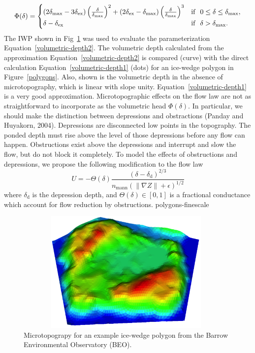 \documentclass[review,11pt]{elsarticle}
\begin{document}
\begin{equation}\label{volumetric-depth2}
\Phi (\delta) =
\begin{cases} (2 \delta_\text{max} - 3 \delta_\text{ex}) \left(\frac{\delta}{\delta_\text{max}} \right )^2 + (2 \delta_\text{ex} -  \delta_\text{max}) \left(\frac{\delta}{\delta_\text{max}} \right )^3 & \text{if} \hskip 0.1in 0 \leq \delta \leq \delta_\text{max}, \\
\delta - \delta_\text{ex} & \text{if} \hskip .1in \delta > \delta_\text{max}.
\end{cases}
\end{equation}
The IWP shown in Fig~\ref{3Dpolygon40} was used to evaluate the parameterization Equation~\ref{volumetric-depth2}. The volumetric depth calculated from the approximation Equation~\ref{volumetric-depth2} is compared (curve) with the direct calculation Equation~\ref{volumetric-depth1} (dots) for an ice-wedge polygon in Figure~\ref{polygons}. Also, shown is the volumetric depth in the absence of microtopography, which is linear with slope unity. Equation~\ref{volumetric-depth1} is a very good approximation.
Microtopographic effects on the flow law are not as straightforward to incorporate as the volumetric head $\Phi(\delta)$. In particular, we should make the distinction between depressions and obstractions (Panday and Huyakorn, 2004). Depressions are disconnected low points in the topography. The ponded depth must rise above the level of those depressions before any flow can happen. Obstructions exist above the depressions and interrupt and slow the flow, but do not block it completely.
To model the effects of obstructions and depressions, we propose the following modification to the flow law
\begin{equation}
U = - \Theta(\delta) \frac{(\delta - \delta_\text{d})^{2/3}}{n_\text{mann} (\| \nabla Z \| +\epsilon)^{1/2}}
\end{equation}
where $\delta_\text{d}$ is the depression depth, and $\Theta(\delta) \in [0,1]$ is a fractional conductance which account for flow reduction by obstructions.
polygons-finescale
\begin{figure}
\centering
\includegraphics[width=11cm, height=6cm]{./figures/polygons-finescale/3Dpolygon40.png}
\caption{Microtopograpy for an example ice-wedge polygon from the Barrow Environmental Observatory (BEO).}
\label{3Dpolygon40}
\end{figure}
\end{document}
